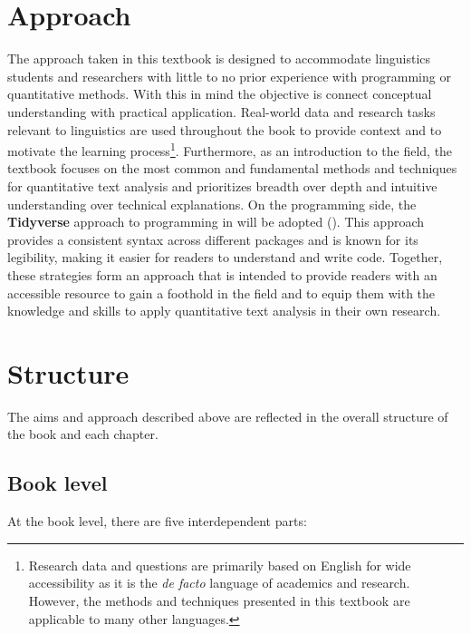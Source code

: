 \documentclass[
  letterpaper,
  krantz1]{latex/krantz-mod}
\theoremstyle{definition}
\theoremstyle{definition}
\theoremstyle{remark}
\begin{document}
\section*{Approach}\label{sec-preface-approach}


The approach taken in this textbook is designed to accommodate
linguistics students and researchers with little to no prior experience
with programming or quantitative methods. With this in mind the
objective is connect conceptual understanding with practical
application. Real-world data and research tasks relevant to linguistics
are used throughout the book to provide context and to motivate the
learning process\footnote{Research data and questions are primarily
  based on English for wide accessibility as it is the \emph{de facto}
  language of academics and research. However, the methods and
  techniques presented in this textbook are applicable to many other
  languages.}. Furthermore, as an introduction to the field, the
textbook focuses on the most common and fundamental methods and
techniques for quantitative text analysis and prioritizes breadth over
depth and intuitive understanding over technical explanations. On the
programming side, the \textbf{Tidyverse} approach to
programming in  will be adopted
(). This
approach provides a consistent syntax across different packages and is
known for its legibility, making it easier for readers to understand and
write code. Together, these strategies form an approach that is intended
to provide readers with an accessible resource to gain a foothold in the
field and to equip them with the knowledge and skills to apply
quantitative text analysis in their own research.

\section*{Structure}\label{sec-preface-structure}


The aims and approach described above are reflected in the overall
structure of the book and each chapter.

\subsection*{Book level}\label{sec-preface-structure-book}

At the book level, there are five interdependent parts:
\end{document}
